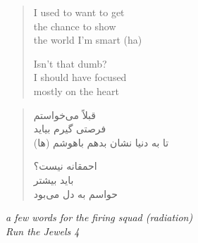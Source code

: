 \clearpage\thispagestyle{empty}\vspace*{\fill}

\begin{otherlanguage}{english}
\begin{verse}
I used to want to get \\
the chance to show \\
the world I'm smart (ha)

Isn't that dumb? \\
I should have focused \\
mostly on the heart
\end{verse}
\end{otherlanguage}
\begin{verse}\small
قبلاً می‌خواستم \\
فرصتی گیرم بیاید \\
تا به دنیا نشان بدهم باهوشم (ها)

احمقانه نیست؟ \\
باید بیشتر \\
حواسم به دل می‌بود
\end{verse}
\begin{otherlanguage}{english}
\begin{flushright}\small\itshape
a few words for the firing squad (radiation) \\
Run the Jewels 4
\end{flushright}
\end{otherlanguage}

\vspace*{\fill}\clearpage
